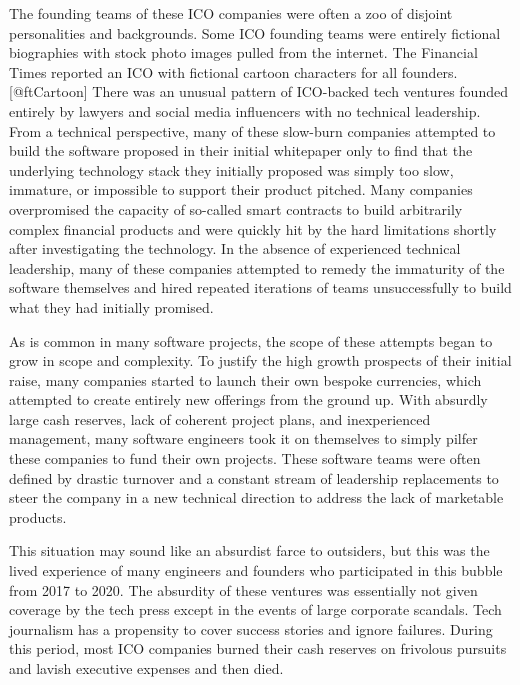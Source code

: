 The founding teams of these ICO companies were often a zoo of disjoint
personalities and backgrounds. Some ICO founding teams were entirely fictional
biographies with stock photo images pulled from the internet. The Financial
Times reported an ICO with fictional cartoon characters for all founders.
[@ftCartoon] There was an unusual pattern of ICO-backed tech ventures founded
entirely by lawyers and social media influencers with no technical leadership.
From a technical perspective, many of these slow-burn companies attempted to
build the software proposed in their initial whitepaper only to find that the
underlying technology stack they initially proposed was simply too slow,
immature, or impossible to support their product pitched. Many companies
overpromised the capacity of so-called smart contracts to build arbitrarily
complex financial products and were quickly hit by the hard limitations shortly
after investigating the technology. In the absence of experienced technical
leadership, many of these companies attempted to remedy the immaturity of the
software themselves and hired repeated iterations of teams unsuccessfully to
build what they had initially promised.


As is common in many software projects, the scope of these attempts began to
grow in scope and complexity. To justify the high growth prospects of their
initial raise, many companies started to launch their own bespoke currencies,
which attempted to create entirely new offerings from the ground up. With
absurdly large cash reserves, lack of coherent project plans, and inexperienced
management, many software engineers took it on themselves to simply pilfer these
companies to fund their own projects. These software teams were often defined by
drastic turnover and a constant stream of leadership replacements to steer the
company in a new technical direction to address the lack of marketable products.

This situation may sound like an absurdist farce to outsiders, but this was the
lived experience of many engineers and founders who participated in this bubble
from 2017 to 2020. The absurdity of these ventures was essentially not given
coverage by the tech press except in the events of large corporate scandals.
Tech journalism has a propensity to cover success stories and ignore failures.
During this period, most ICO companies burned their cash reserves on frivolous
pursuits and lavish executive expenses and then died.

